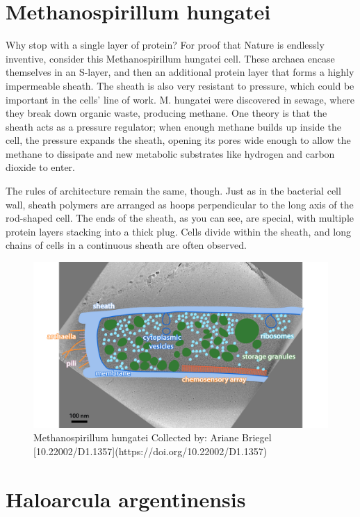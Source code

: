 \documentclass[]{tufte-book}
\begin{document}
\section{Methanospirillum hungatei}\label{methanospirillum-hungatei}

Why stop with a single layer of protein? For proof that Nature is
endlessly inventive, consider this Methanospirillum hungatei cell. These
archaea encase themselves in an S-layer, and then an additional protein
layer that forms a highly impermeable sheath. The sheath is also very
resistant to pressure, which could be important in the cells' line of
work. M. hungatei were discovered in sewage, where they break down
organic waste, producing methane. One theory is that the sheath acts as
a pressure regulator; when enough methane builds up inside the cell, the
pressure expands the sheath, opening its pores wide enough to allow the
methane to dissipate and new metabolic substrates like hydrogen and
carbon dioxide to enter.

The rules of architecture remain the same, though. Just as in the
bacterial cell wall, sheath polymers are arranged as hoops perpendicular
to the long axis of the rod-shaped cell. The ends of the sheath, as you
can see, are special, with multiple protein layers stacking into a thick
plug. Cells divide within the sheath, and long chains of cells in a
continuous sheath are often observed.

\begin{figure}
\includegraphics{img/2_8_Mhungatei} \caption[Methanospirillum hungatei Collected by]{Methanospirillum hungatei Collected by: Ariane Briegel [10.22002/D1.1357](https://doi.org/10.22002/D1.1357)}\label{fig:unnamed-chunk-24}
\end{figure}

\section{Haloarcula argentinensis}\label{haloarcula-argentinensis}
\end{document}
